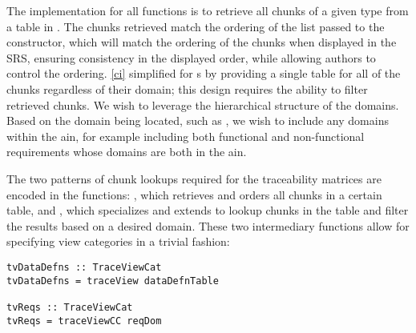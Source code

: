 
The implementation for all  functions is to retrieve all chunks of a given type from a table in . The chunks retrieved match the ordering of the list passed to the  constructor, which will match the ordering of the chunks when displayed in the SRS, ensuring consistency in the displayed order, while allowing authors to control the ordering. \autoref{ci} simplified  for s by providing a single table for all of the chunks regardless of their domain; this design requires the ability to filter retrieved chunks. We wish to leverage the hierarchical structure of the  domains. Based on the domain being located, such as , we wish to include any domains within the ain, for example including both functional and non-functional requirements whose domains are both in the ain.

The two patterns of chunk lookups required for the traceability matrices are encoded in the functions: , which retrieves and orders all chunks in a certain table, and , which specializes and extends  to lookup chunks in the  table and filter the results based on a desired domain. These two intermediary functions allow for specifying view categories in a trivial fashion:

\begin{tcolorbox}
\begin{verbatim}
tvDataDefns :: TraceViewCat
tvDataDefns = traceView dataDefnTable

tvReqs :: TraceViewCat
tvReqs = traceViewCC reqDom
\end{verbatim}
\end{tcolorbox}


